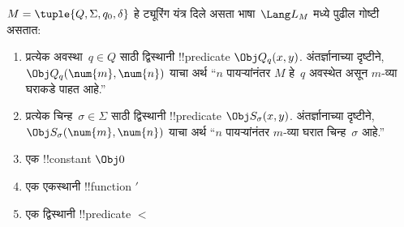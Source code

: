 \documentclass[../../../include/open-logic-section]{subfiles}
\begin{document}
\begin{defn}
$M = \tuple{Q, \Sigma, q_0, \delta}$
हे ट्यूरिंग यंत्र दिले असता
भाषा~$\Lang L_M$ मध्ये पुढील
गोष्टी असतात:
\begin{enumerate}
\item प्रत्येक अवस्था~$q \in Q$ साठी
  द्विस्थानी !!{predicate} $\Obj Q_q(x, y)$.
  अंतर्ज्ञानाच्या दृष्टीने,
  $\Obj Q_q(\num{m}, \num{n})$
  याचा अर्थ “$n$ पायऱ्यांनंतर
  $M$ हे~$q$ अवस्थेत असून
  $m$-व्या घराकडे पाहत आहे.”
\item प्रत्येक चिन्ह~$\sigma\in \Sigma$
  साठी द्विस्थानी !!{predicate}
  $\Obj S_\sigma(x, y)$.
  अंतर्ज्ञानाच्या दृष्टीने,
  $\Obj S_\sigma(\num{m},
  \num{n})$ याचा अर्थ “$n$
  पायऱ्यांनंतर $m$-व्या घरात
  चिन्ह~$\sigma$ आहे.”
\item एक !!{constant} $\Obj 0$
\item एक एकस्थानी !!{function} $\prime$
\item एक द्विस्थानी !!{predicate} $<$
\end{enumerate}
\end{defn}
\end{document}
